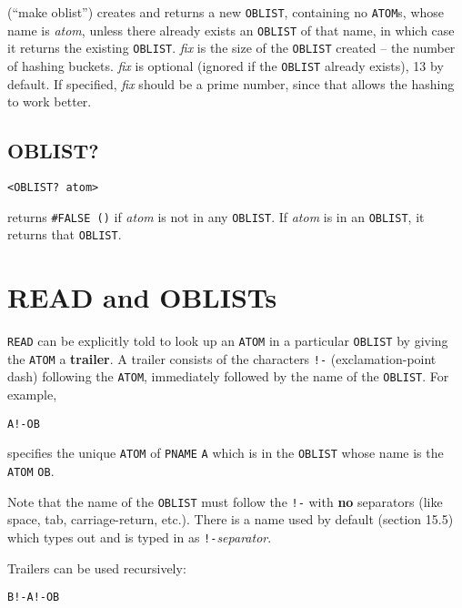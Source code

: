 \documentclass[a4paper]{scrbook}
\begin{document}
 (``make oblist'') creates and returns a new \texttt{OBLIST}, containing no \texttt{ATOM}s,
whose name is \emph{atom}, unless there already exists an \texttt{OBLIST} of that name, in which case it returns the
existing \texttt{OBLIST}. \emph{fix} is the size of the \texttt{OBLIST} created -- the number of hashing buckets.
\emph{fix} is optional (ignored if the \texttt{OBLIST} already exists), 13 by default. If specified, \emph{fix} should be a
prime number, since that allows the hashing to work better.

\subsection{OBLIST?}\label{oblist}

\begin{verbatim}
<OBLIST? atom>
\end{verbatim}

 returns \texttt{\#FALSE\ ()} if \emph{atom} is not in any \texttt{OBLIST}. If \emph{atom}
is in an \texttt{OBLIST}, it returns that \texttt{OBLIST}.

\section{READ and OBLISTs}\label{read-and-oblists}

\texttt{READ} can be explicitly told to look up an \texttt{ATOM} in a particular \texttt{OBLIST} by
giving the \texttt{ATOM} a \textbf{trailer}. A trailer consists of the characters \texttt{!-} 
(exclamation-point dash) following the \texttt{ATOM}, immediately followed by the name of the \texttt{OBLIST}. For example,

\begin{verbatim}
A!-OB
\end{verbatim}

specifies the unique \texttt{ATOM} of \texttt{PNAME} \texttt{A} which is in the \texttt{OBLIST} whose name is the
\texttt{ATOM} \texttt{OB}.

Note that the name of the \texttt{OBLIST} must follow the \texttt{!-} with \textbf{no} separators (like space, tab,
carriage-return, etc.). There is a name used by default (section 15.5) which types out and is typed in as
\texttt{!-}\emph{separator}.

Trailers can be used recursively:

\begin{verbatim}
B!-A!-OB
\end{verbatim}
\end{document}
